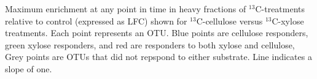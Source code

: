 Maximum enrichment at any point in time in heavy fractions of
$^{13}$C-treatments relative to control (expressed as LFC) shown for
$^{13}$C-cellulose versus $^{13}$C-xylose treatments. Each point represents an
OTU. Blue points are cellulose responders, green xylose responders, and red are
responders to both xylose and cellulose, Grey points are OTUs that did not
repspond to either substrate. Line indicates a slope of one.
